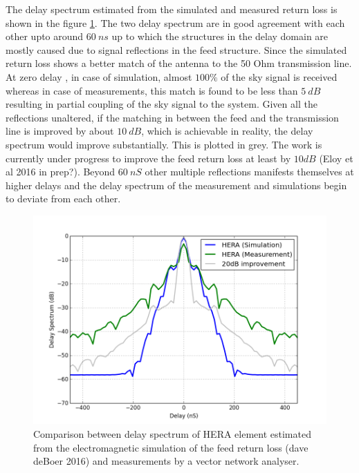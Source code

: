 \documentclass[twocolumn]{emulateapj}
\begin{document}
\begin{itemize}
The delay spectrum estimated from the simulated and measured return loss is shown in the figure \ref{fig:sim_em}. The two delay spectrum are in good agreement with each other upto around $60~ns$ up to which the structures in the delay domain are mostly caused due to signal reflections in the feed structure. Since the simulated return loss shows a better match of the antenna to the 50 Ohm transmission line. At zero delay , in case of simulation, almost $100\%$ of the sky signal is received whereas in case of measurements, this match is found to be less than $5~dB$ resulting in partial coupling of the sky signal to the system. Given all the reflections unaltered, if the matching in between the feed and the transmission line is improved by about $10~dB$, which is achievable in reality, the delay spectrum would improve substantially. This is plotted in grey. The work is currently under progress to improve the feed return loss at least by  $10dB$ (Eloy et al 2016 in prep?). Beyond $60~nS$ other multiple reflections manifests themselves at higher delays and the delay spectrum of the measurement and simulations begin to deviate from each other.

\begin{figure}
\centering
\includegraphics[width=\linewidth]{plots/delay_sim_meas.png}
\caption{Comparison between delay spectrum of HERA element estimated from the electromagnetic simulation of the feed return loss (dave deBoer 2016) and measurements by a vector network analyser.}
\label{fig:sim_em}
\end{figure}


\end{itemize}
\end{document}

